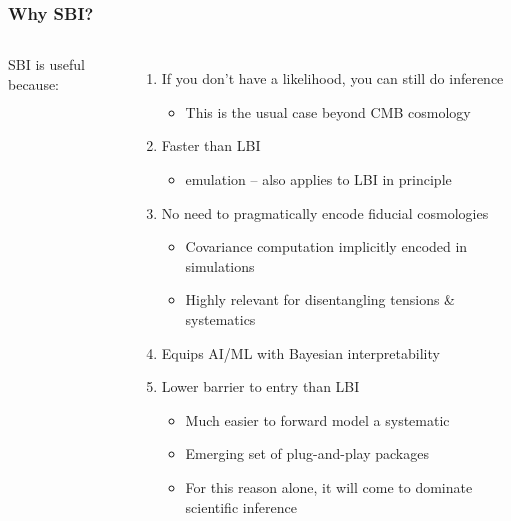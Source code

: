 \documentclass[aspectratio=169]{beamer}
\begin{document}
\begin{frame}
    \frametitle{Why SBI?}
    \begin{columns}
        SBI is useful because:
        \begin{enumerate}
            \item If you don't have a likelihood, you can still do inference
                \begin{itemize}
                    \item This is the usual case beyond CMB cosmology
                \end{itemize}
            \item Faster than LBI
                \begin{itemize}
                    \item emulation -- also applies to LBI in principle
                \end{itemize}
            \item No need to pragmatically encode fiducial cosmologies
                \begin{itemize}
                    \item Covariance computation implicitly encoded in simulations
                    \item Highly relevant for disentangling tensions \& systematics
                \end{itemize}
            \item Equips AI/ML with Bayesian interpretability
            \item Lower barrier to entry than LBI
                \begin{itemize}
                    \item Much easier to forward model a systematic
                    \item Emerging set of plug-and-play packages
                    \item For this reason alone, it will come to dominate scientific inference
                \end{itemize}
        \end{enumerate}


\end{columns}
\end{frame}
\end{document}
